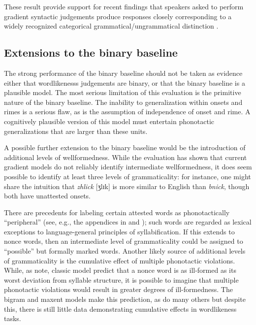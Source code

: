 These result provide support for recent findings that speakers asked to perform gradient syntactic judgements produce responses closely corresponding to a widely recognized categorical grammatical/ungrammatical distinction \citep{Sprouse2007}.

\subsection{Extensions to the binary baseline}

The strong performance of the binary baseline should not be taken as evidence either that wordlikenesss judgements are binary, or that the binary baseline is a plausible model. The most serious limitation of this evaluation is the primitive nature of the binary baseline. The inability to generalization within onsets and rimes is a serious flaw, as is the assumption of independence of onset and rime. A cognitively plausible version of this model must entertain phonotactic generalizations that are larger than these units.

A possible further extension to the binary baseline would be the introduction of additional levels of wellformedness. While the evaluation has shown that current gradient models do not reliably identify intermediate wellformedness, it does seem possible to identify at least three levels of grammaticality: for instance, one might share the intuition that \emph{zhlick} [ʒlɪk] is more similar to English than \emph{bnick}, though both have unattested onsets. 

There are precedents for labeling certain attested words as phonotactically ``peripheral'' (see, e.g., the appendices in \citealt{Myers1987} and \citealt{Borowsky1989}); such words are regarded as lexical exceptions to language-general principles of syllabification. If this extends to nonce words, then an intermediate level of grammaticality could be assigned to ``possible'' but formally marked words. Another likely source of additional levels of grammaticality is the cumulative effect of multiple phonotactic violations. While, as \citet{Coleman1997} note, classic model predict that a nonce word is as ill-formed as its worst deviation from syllable structure, it is possible to imagine that multiple phonotactic violations would result in greater degrees of ill-formedness. The bigram and maxent models make this prediction, as do many others \citep[e.g.,][]{Legendre1990,Levelt2000,Albright2008,Anttila2008,Pater2009b} but despite this, there is still little data demonstrating cumulative effects in wordlikeness tasks.

